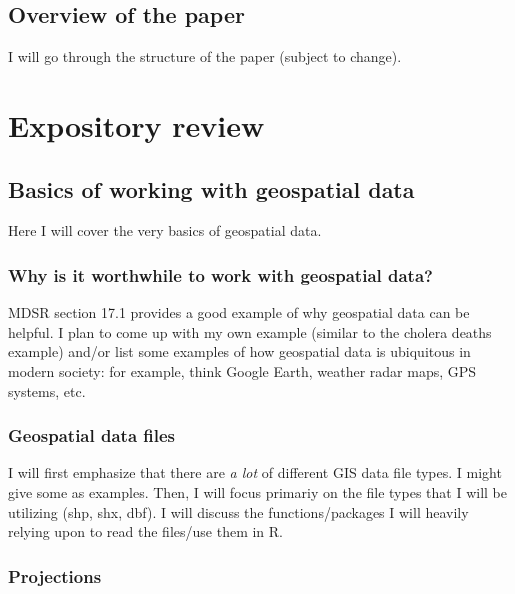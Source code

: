 \documentclass[12pt]{article}
\begin{document}
\hypertarget{overview-of-the-paper}{%
\subsection{Overview of the paper}\label{overview-of-the-paper}}

I will go through the structure of the paper (subject to change).

\hypertarget{expository-review}{%
\section{Expository review}\label{expository-review}}

\hypertarget{basics-of-working-with-geospatial-data}{%
\subsection{Basics of working with geospatial
data}\label{basics-of-working-with-geospatial-data}}

Here I will cover the very basics of geospatial data.

\hypertarget{why-is-it-worthwhile-to-work-with-geospatial-data}{%
\subsubsection{Why is it worthwhile to work with geospatial
data?}\label{why-is-it-worthwhile-to-work-with-geospatial-data}}

MDSR section 17.1 provides a good example of why geospatial data can be
helpful. I plan to come up with my own example (similar to the cholera
deaths example) and/or list some examples of how geospatial data is
ubiquitous in modern society: for example, think Google Earth, weather
radar maps, GPS systems, etc.

\hypertarget{geospatial-data-files}{%
\subsubsection{Geospatial data files}\label{geospatial-data-files}}

I will first emphasize that there are \emph{a lot} of different GIS data
file types. I might give some as examples. Then, I will focus primariy
on the file types that I will be utilizing (shp, shx, dbf). I will
discuss the functions/packages I will heavily relying upon to read the
files/use them in R.

\hypertarget{projections}{%
\subsubsection{Projections}\label{projections}}
\end{document}
